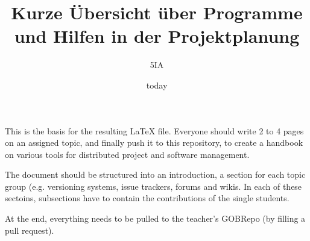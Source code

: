 \documentclass[a4paper]{article}
\begin{document}
\title{Kurze Übersicht über Programme und Hilfen in der Projektplanung}
\author{5IA}
\date{today}

\maketitle














    This is the basis for the resulting LaTeX file.
    Everyone should write 2 to 4 pages on an assigned topic, and finally push it to this repository, to create a handbook on various tools
    for distributed project and software management.
    
    The document should be structured into an introduction, a section for each topic group (e.g. versioning systems, issue trackers, forums and wikis.
    In each of these sectoins, subsections have to contain the contributions of the single students.

    At the end, everything needs to be pulled to the teacher's GOBRepo (by filling a pull request).
\end{document}
